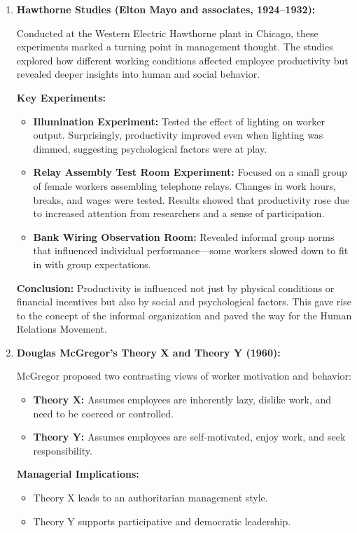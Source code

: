 \documentclass[12pt,a4paper]{book}
\begin{document}
\begin{enumerate}
    \item \textbf{Hawthorne Studies (Elton Mayo and associates, 1924–1932):}

    Conducted at the Western Electric Hawthorne plant in Chicago, these experiments marked a turning point in management thought. The studies explored how different working conditions affected employee productivity but revealed deeper insights into human and social behavior.

    \textbf{Key Experiments:}
    \begin{itemize}
        \item \textbf{Illumination Experiment:} Tested the effect of lighting on worker output. Surprisingly, productivity improved even when lighting was dimmed, suggesting psychological factors were at play.
        \item \textbf{Relay Assembly Test Room Experiment:} Focused on a small group of female workers assembling telephone relays. Changes in work hours, breaks, and wages were tested. Results showed that productivity rose due to increased attention from researchers and a sense of participation.
        \item \textbf{Bank Wiring Observation Room:} Revealed informal group norms that influenced individual performance—some workers slowed down to fit in with group expectations.
    \end{itemize}

    \textbf{Conclusion:} Productivity is influenced not just by physical conditions or financial incentives but also by social and psychological factors. This gave rise to the concept of the informal organization and paved the way for the Human Relations Movement.

    \item \textbf{Douglas McGregor's Theory X and Theory Y (1960):}

    McGregor proposed two contrasting views of worker motivation and behavior:

    \begin{itemize}
        \item \textbf{Theory X:} Assumes employees are inherently lazy, dislike work, and need to be coerced or controlled.
        \item \textbf{Theory Y:} Assumes employees are self-motivated, enjoy work, and seek responsibility.
    \end{itemize}

    \textbf{Managerial Implications:}
    \begin{itemize}
        \item Theory X leads to an authoritarian management style.
        \item Theory Y supports participative and democratic leadership.
    \end{itemize}


\end{enumerate}
\end{document}
